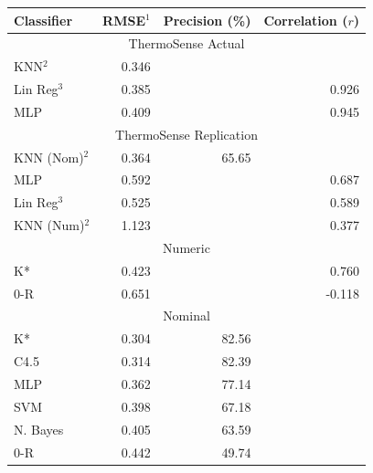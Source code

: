 \documentclass[../thesis/thesis.tex]{subfiles}
\begin{document}
\begin{table}
\centering
\begin{tabular}{|l|r|r|r|}
\hline
\textbf{Classifier} & \textbf{RMSE$^1$} & \textbf{Precision (\%)} & \textbf{Correlation ($r$)} \\ \hline
\multicolumn{4}{|c|}{\cellcolor{black!15} ThermoSense Actual}                         \\ \hline
KNN$^2$             & 0.346         &             &              \\ \hline
Lin Reg$^3$         & 0.385         &             & 0.926        \\ \hline
MLP                 & 0.409         &             & 0.945        \\ \hline
\multicolumn{4}{|c|}{\cellcolor{black!15} ThermoSense Replication}                    \\ \hline
KNN (Nom)$^2$       & 0.364         & 65.65       &              \\ \hline
MLP                 & 0.592         &             & 0.687        \\ \hline
Lin Reg$^3$         & 0.525         &             & 0.589        \\ \hline
KNN (Num)$^2$       & 1.123         &             & 0.377        \\ \hline
\multicolumn{4}{|c|}{\cellcolor{black!15} Numeric}                                    \\ \hline
K*                  & 0.423         &             & 0.760        \\ \hline
0-R                 & 0.651         &             & -0.118       \\ \hline
\multicolumn{4}{|c|}{\cellcolor{black!15} Nominal}                                    \\ \hline
K*                  & 0.304         & 82.56       &              \\ \hline
C4.5                & 0.314         & 82.39       &              \\ \hline
MLP                 & 0.362         & 77.14       &              \\ \hline
SVM                 & 0.398         & 67.18       &              \\ \hline
N. Bayes            & 0.405         & 63.59       &              \\ \hline
0-R                 & 0.442         & 49.74       &              \\ \hline
\end{tabular}\\

\end{table}
\end{document}
